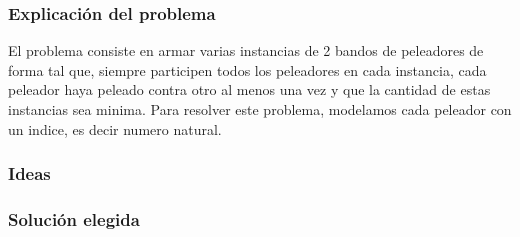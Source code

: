 \subsubsection{Explicación del problema}
El problema consiste en armar varias instancias de 2 bandos de peleadores de forma tal que, siempre participen todos los peleadores en cada instancia, cada peleador haya peleado contra otro al menos una vez y que la cantidad de estas instancias sea minima.
Para resolver este problema, modelamos cada peleador con un indice, es decir numero natural.
\subsubsection{Ideas}

\subsubsection{Solución elegida}
